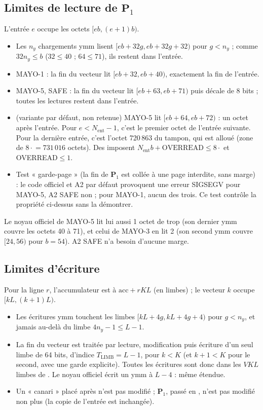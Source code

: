 \subsection{Limites de lecture de $\mathbf{P}_1$}
L'entrée $e$ occupe les octets $[eb,(e+1)b)$.
\begin{itemize}
\item \Pc{} Les $n_y$ chargements ymm lisent $[eb+32g,eb+32g+32)$ pour $g<n_y$ ; comme $32n_y\le b$ ($32\le40$ ; $64\le71$), ils restent dans l'entrée.
\item \Pc{} MAYO-1 : la fin du vecteur lit $[eb+32,eb+40)$, exactement la fin de l'entrée.
\item \Pc{} MAYO-5, SAFE : la fin du vecteur lit $[eb+63,eb+71)$ puis décale de 8 bits ; toutes les lectures restent dans l'entrée.
\item \Pc{} (variante par défaut, non retenue) MAYO-5 lit $[eb+64,eb+72)$ : un octet après l'entrée. Pour $e<N_{\mathrm{ent}}-1$, c'est le premier octet de l'entrée suivante. Pour la dernière entrée, c'est l'octet 720\,863 du tampon, qui est alloué (zone de $8\cdot$$=731\,016$ octets). Des  imposent $N_{\mathrm{ent}}b+\text{OVERREAD}\le8\cdot$ et OVERREAD$\le1$.
\item \Pe{} Test « garde-page » (la fin de $\mathbf{P}_1$ est collée à une page interdite, sans marge) : le code officiel et A2 par défaut provoquent une erreur SIGSEGV pour MAYO-5, A2 SAFE non ; pour MAYO-1, aucun des trois. Ce test contrôle la propriété ci-dessus sans la démontrer.
\end{itemize}
Le noyau officiel de MAYO-5 lit lui aussi 1 octet de trop (son dernier ymm couvre les octets 40 à 71), et celui de MAYO-3 en lit 2 (son second ymm couvre $[24,56)$ pour $b=54$). A2 SAFE n'a besoin d'aucune marge.

\subsection{Limites d'écriture}
Pour la ligne $r$, l'accumulateur est à $\mathrm{acc}+rKL$ (en limbes) ; le vecteur $k$ occupe $[kL,(k+1)L)$.
\begin{itemize}
\item \Pc{} Les écritures ymm touchent les limbes $[kL+4g,kL+4g+4)$ pour $g<n_y$, et jamais au-delà du limbe $4n_y-1\le L-1$.
\item \Pc{} La fin du vecteur est traitée par lecture, modification puis écriture d'un seul limbe de 64 bits, d'indice $T_{\mathrm{LIMB}}=L-1$, pour $k<K$ (et $k+1<K$ pour le second, avec une garde explicite). Toutes les écritures sont donc dans les $VKL$ limbes de . Le noyau officiel écrit un ymm à $L-4$ : même étendue.
\item \Pe{} Un « canari » placé après  n'est pas modifié ; $\mathbf{P}_1$, passé en , n'est pas modifié non plus (la copie de l'entrée est inchangée).
\end{itemize}

